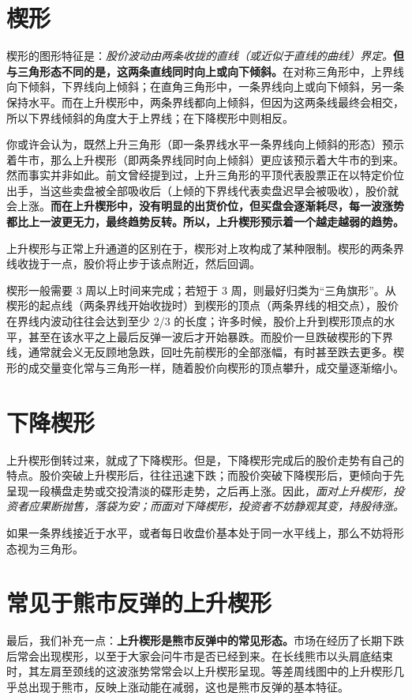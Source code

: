 \section{楔形}
楔形的图形特征是：\textit{股价波动由两条收拢的直线（或近似于直线的曲线）界定。}\textbf{但与三角形态不同的是，这两条直线同时向上或向下倾斜。}在对称三角形中，上界线向下倾斜，下界线向上倾斜；在直角三角形中，一条界线向上或向下倾斜，另一条保持水平。而在上升楔形中，两条界线都向上倾斜，但因为这两条线最终会相交，所以下界线倾斜的角度大于上界线；在下降楔形中则相反。

你或许会认为，既然上升三角形（即一条界线水平一条界线向上倾斜的形态）预示着牛市，那么上升楔形（即两条界线同时向上倾斜）更应该预示着大牛市的到来。然而事实并非如此。前文曾经提到过，上升三角形的平顶代表股票正在以特定价位出手，当这些卖盘被全部吸收后（上倾的下界线代表卖盘迟早会被吸收），股价就会上涨。\textbf{而在上升楔形中，没有明显的出货价位，但买盘会逐渐耗尽，每一波涨势都比上一波更无力，最终趋势反转。所以，上升楔形预示着一个越走越弱的趋势。}

上升楔形与正常上升通道的区别在于，楔形对上攻构成了某种限制。楔形的两条界线收拢于一点，股价将止步于该点附近，然后回调。

楔形一般需要 3 周以上时间来完成；若短于 3 周，则最好归类为“三角旗形”。从楔形的起点线（两条界线开始收拢时）到楔形的顶点（两条界线的相交点），股价在界线内波动往往会达到至少 2/3 的长度；许多时候，股价上升到楔形顶点的水平，甚至在该水平之上最后反弹一波后才开始暴跌。而股价一旦跌破楔形的下界线，通常就会义无反顾地急跌，回吐先前楔形的全部涨幅，有时甚至跌去更多。楔形的成交量变化常与三角形一样，随着股价向楔形的顶点攀升，成交量逐渐缩小。
\section{下降楔形}
上升楔形倒转过来，就成了下降楔形。但是，下降楔形完成后的股价走势有自己的特点。股价突破上升楔形后，往往迅速下跌；而股价突破下降楔形后，更倾向于先呈现一段横盘走势或交投清淡的碟形走势，之后再上涨。因此，\textit{面对上升楔形，投资者应果断抛售，落袋为安；而面对下降楔形，投资者不妨静观其变，持股待涨。}

如果一条界线接近于水平，或者每日收盘价基本处于同一水平线上，那么不妨将形态视为三角形。
\section{常见于熊市反弹的上升楔形}
最后，我们补充一点：\textbf{上升楔形是熊市反弹中的常见形态。}市场在经历了长期下跌后常会出现楔形，以至于大家会问牛市是否已经到来。在长线熊市以头肩底结束时，其左肩至颈线的这波涨势常常会以上升楔形呈现。等差周线图中的上升楔形几乎总出现于熊市，反映上涨动能在减弱，这也是熊市反弹的基本特征。
